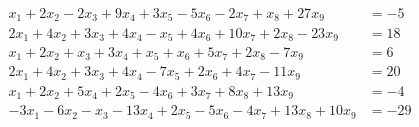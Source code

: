 \begin{align*}
x_1 +2x_ 2-2x_3 +9x_4 +3x_5 -5x_6-2x_7 +x_8 +27x_9 &= -5 \\ 
2x_1 +4x_2 +3x_3 +4x_4 -x_5 +4x_6 +10x_7 +2x_8 -23x_9 &=18 \\ 
x_1 +2x_2 +x_3 + 3x_4 +x_5 +x_6 +5x_7 +2x_8 -7x_9 &=6 \\ 
2x_1 +4x_2 +3x_3 + 4x_4 -7x_5 +2x_6 +4x_7 -11x_ 9&=20 \\ 
x_1 +2x_2 + 5x_4 +2x_5 -4x_6 +3x_7 +8x_8 +13x_9 &= -4 \\ 
-3x_1 -6x_2 -x_3 -13x_4 +2x_5 -5x_6 -4x_7 +13x_ 8+10x_ 9&=-29
\end{align*}